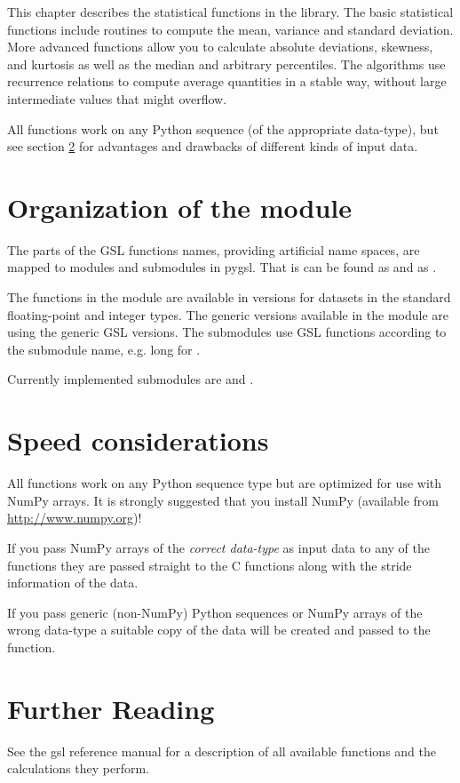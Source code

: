 
This chapter describes the statistical functions in the library.  The
basic statistical functions include routines to compute the mean,
variance and standard deviation. More advanced functions allow you to
calculate absolute deviations, skewness, and kurtosis as well as the
median and arbitrary percentiles.  The algorithms use recurrence
relations to compute average quantities in a stable way, without large
intermediate values that might overflow. 

All functions work on any Python sequence (of the appropriate
data-type), but see section \ref{Speed considerations} for advantages and
drawbacks of different kinds of input data.


\section{Organization of the module}

The parts of the GSL functions names, providing artificial name spaces,
are mapped to modules and submodules in pygsl.  That is
 can be found as  and
 as .

The functions in the module are available in versions for datasets in
the standard floating-point and integer types. The generic versions
available in the  module are using the generic
GSL  versions.  The submodules use GSL functions according
to the submodule name, e.g. long for .

Currently implemented submodules are  and
.



\section{Speed considerations}
\label{Speed considerations}
All functions work on any Python sequence type but are optimized for use
with NumPy arrays. It is strongly suggested that you install NumPy
(available from \url{http://www.numpy.org})!

If you pass NumPy arrays of the \emph{correct data-type} as input data
to any of the functions they are passed straight to the C functions
along with the stride information of the data.

If you pass generic (non-NumPy) Python sequences or NumPy arrays of the
wrong data-type a suitable copy of the data will be created and passed
to the function.


\section{Further Reading}

See the gsl reference manual for a description of all available
functions and the calculations they perform.

